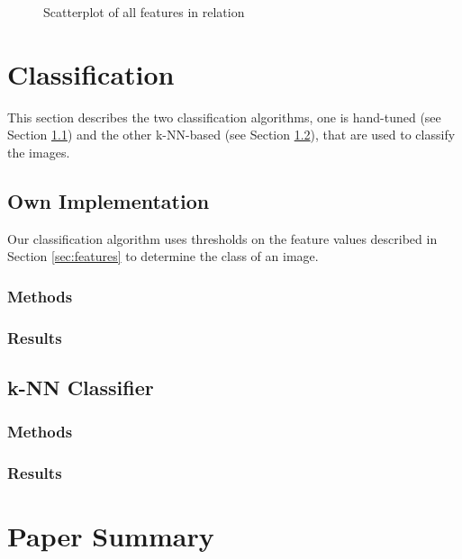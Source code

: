 \documentclass[a4paper,psfig,subfigure,epsfig,fleqn,amssmb,float,caption,fontenc,ausarbeitung]{article}
\begin{document}
\begin{figure}
	\centering
	\setlength\figureheight{4cm} 
	\setlength\figurewidth{10cm}
	
	\caption{Scatterplot of all features in relation}
	\label{fig:gscatter}
\end{figure}





\section{Classification}
\label{sec:classification}
This section describes the two classification algorithms, one is hand-tuned (see Section \ref{sec:own}) and the other k-NN-based (see Section \ref{sec:kNN}), that are used to classify the images. 

\subsection{Own Implementation}
\label{sec:own}
Our classification algorithm uses thresholds on the feature values described in Section \ref{sec:features} to determine the class of an image.

\subsubsection{Methods}
\label{sec:ownMethods}

\subsubsection{Results}
\label{sec:ownResults}

\subsection{k-NN Classifier}
\label{sec:kNN}

\subsubsection{Methods}
\label{sec:kNNMethods}

\subsubsection{Results}
\label{sec:kNNResults}

\section{Paper Summary}
\label{sec:paperSummary}
\cite{beyer1999nearest}



\fontsize{9}{10pt}


\end{document}
